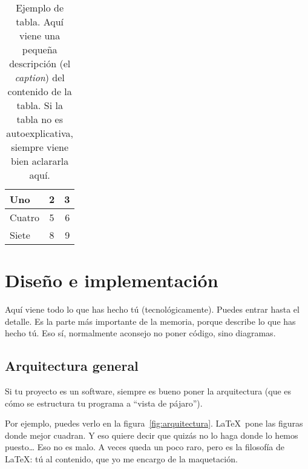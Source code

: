 \documentclass[a4paper, 12pt]{book}
\begin{document}
\begin{table}
 \begin{center}
  \begin{tabular}{ | l | c | r |} %
    \hline
    Uno & 2 & 3 \\ \hline %
    Cuatro & 5 & 6 \\ \hline
    Siete & 8 & 9 \\
    \hline
  \end{tabular}
  \label{tabla:ejemplo}
  \caption{Ejemplo de tabla. Aquí viene una pequeña descripción (el \emph{caption}) del contenido de la tabla. Si la tabla no es autoexplicativa, siempre viene bien aclararla aquí.}
 \end{center}
\end{table}




\cleardoublepage
\chapter{Diseño e implementación}

Aquí viene todo lo que has hecho tú (tecnológicamente). 
Puedes entrar hasta el detalle. 
Es la parte más importante de la memoria, porque describe lo que has hecho tú.
Eso sí, normalmente aconsejo no poner código, sino diagramas.

\section{Arquitectura general} 
\label{sec:arquitectura}

Si tu proyecto es un software, siempre es bueno poner la arquitectura (que es cómo se estructura tu programa a ``vista de pájaro'').

Por ejemplo, puedes verlo en la figura~\ref{fig:arquitectura}.
\LaTeX \ pone las figuras donde mejor cuadran. 
Y eso quiere decir que quizás no lo haga donde lo hemos puesto\ldots
Eso no es malo.
A veces queda un poco raro, pero es la filosofía de \LaTeX: tú al contenido, que yo me encargo de la maquetación.
\end{document}
